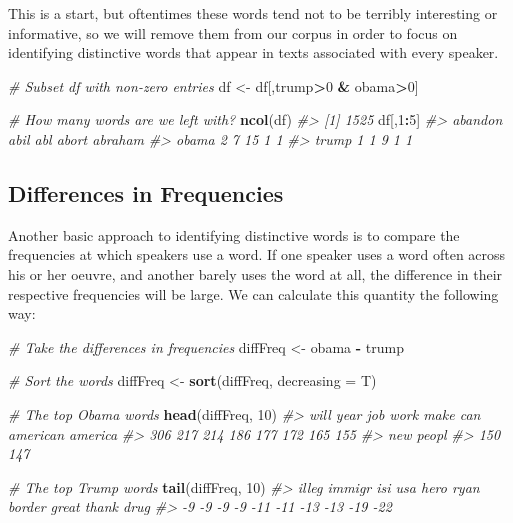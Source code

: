 \documentclass[
]{book}
\newenvironment{Shaded}{\begin{snugshade}}{\end{snugshade}}
\newcommand{\CommentTok}[1]{\textcolor[rgb]{0.56,0.35,0.01}{\textit{#1}}}
\newcommand{\DataTypeTok}[1]{\textcolor[rgb]{0.13,0.29,0.53}{#1}}
\newcommand{\DecValTok}[1]{\textcolor[rgb]{0.00,0.00,0.81}{#1}}
\newcommand{\KeywordTok}[1]{\textcolor[rgb]{0.13,0.29,0.53}{\textbf{#1}}}
\newcommand{\NormalTok}[1]{#1}
\newcommand{\OperatorTok}[1]{\textcolor[rgb]{0.81,0.36,0.00}{\textbf{#1}}}
\newcommand{\StringTok}[1]{\textcolor[rgb]{0.31,0.60,0.02}{#1}}
\begin{document}
This is a start, but oftentimes these words tend not to be terribly interesting or informative, so we will remove them from our corpus in order to focus on identifying distinctive words that appear in texts associated with every speaker.

\begin{Shaded}
\begin{Highlighting}[]
\CommentTok{# Subset df with non-zero entries}
\NormalTok{df <-}\StringTok{ }\NormalTok{df[,trump}\OperatorTok{>}\DecValTok{0} \OperatorTok{&}\StringTok{ }\NormalTok{obama}\OperatorTok{>}\DecValTok{0}\NormalTok{]}

\CommentTok{# How many words are we left with?}
\KeywordTok{ncol}\NormalTok{(df)}
\CommentTok{#> [1] 1525}
\NormalTok{df[,}\DecValTok{1}\OperatorTok{:}\DecValTok{5}\NormalTok{]}
\CommentTok{#>       abandon abil abl abort abraham}
\CommentTok{#> obama       2    7  15     1       1}
\CommentTok{#> trump       1    1   9     1       1}
\end{Highlighting}
\end{Shaded}

\hypertarget{differences-in-frequencies}{%
\subsection{Differences in Frequencies}\label{differences-in-frequencies}}

Another basic approach to identifying distinctive words is to compare the frequencies at which speakers use a word. If one speaker uses a word often across his or her oeuvre, and another barely uses the word at all, the difference in their respective frequencies will be large. We can calculate this quantity the following way:

\begin{Shaded}
\begin{Highlighting}[]
\CommentTok{# Take the differences in frequencies}
\NormalTok{diffFreq <-}\StringTok{ }\NormalTok{obama }\OperatorTok{-}\StringTok{ }\NormalTok{trump}

\CommentTok{# Sort the words}
\NormalTok{diffFreq <-}\StringTok{ }\KeywordTok{sort}\NormalTok{(diffFreq, }\DataTypeTok{decreasing =}\NormalTok{ T)}

\CommentTok{# The top Obama words}
\KeywordTok{head}\NormalTok{(diffFreq, }\DecValTok{10}\NormalTok{)}
\CommentTok{#>     will     year      job     work     make      can american  america }
\CommentTok{#>      306      217      214      186      177      172      165      155 }
\CommentTok{#>      new    peopl }
\CommentTok{#>      150      147}

\CommentTok{# The top Trump words}
\KeywordTok{tail}\NormalTok{(diffFreq, }\DecValTok{10}\NormalTok{)}
\CommentTok{#>  illeg immigr    isi    usa   hero   ryan border  great  thank   drug }
\CommentTok{#>     -9     -9     -9     -9    -11    -11    -13    -13    -19    -22}
\end{Highlighting}
\end{Shaded}
\end{document}
